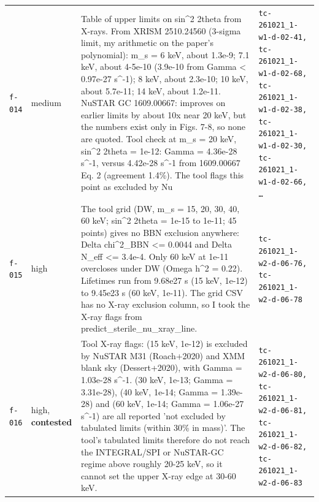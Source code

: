 \documentclass[11pt,a4paper]{article}
\begin{document}
\begin{longtable}{@{}p{}p{}p{}p{}@{}}
\texttt{f-014} & medium & Table of upper limits on sin\textasciicircum{}2 2theta from X-rays. From XRISM 2510.24560 (3-sigma limit, my arithmetic on the paper's polynomial): m\_s = 6 keV, about 1.3e-9; 7.1 keV, about 4-5e-10 (3.9e-10 from Gamma \textless{} 0.97e-27 s\textasciicircum{}-1); 8 keV, about 2.3e-10; 10 keV, about 5.7e-11; 14 keV, about 1.2e-11. NuSTAR GC 1609.00667: improves on earlier limits by about 10x near 20 keV, but the numbers exist only in Figs. 7-8, so none are quoted. Tool check at m\_s = 20 keV, sin\textasciicircum{}2 2theta = 1e-12: Gamma = 4.36e-28 s\textasciicircum{}-1, versus 4.42e-28 s\textasciicircum{}-1 from 1609.00667 Eq. 2 (agreement 1.4\%). The tool flags this point as excluded by Nu & \texttt{tc-261021\_\allowbreak{}1-w1-d-02-41,\allowbreak{} tc-261021\_\allowbreak{}1-w1-d-02-68,\allowbreak{} tc-261021\_\allowbreak{}1-w1-d-02-38,\allowbreak{} tc-261021\_\allowbreak{}1-w1-d-02-30,\allowbreak{} tc-261021\_\allowbreak{}1-w1-d-02-66,\allowbreak{} \ldots{}\allowbreak{}} \\
\texttt{f-015} & high & The tool grid (DW, m\_s = 15, 20, 30, 40, 60 keV; sin\textasciicircum{}2 2theta = 1e-15 to 1e-11; 45 points) gives no BBN exclusion anywhere: \textbar{}Delta chi\textasciicircum{}2\_BBN\textbar{} \textless{}= 0.0044 and Delta N\_eff \textless{}= 3.4e-4. Only 60 keV at 1e-11 overcloses under DW (Omega h\textasciicircum{}2 = 0.22). Lifetimes run from 9.68e27 s (15 keV, 1e-12) to 9.45e23 s (60 keV, 1e-11). The grid CSV has no X-ray exclusion column, so I took the X-ray flags from predict\_sterile\_nu\_xray\_line. & \texttt{tc-261021\_\allowbreak{}1-w2-d-06-76,\allowbreak{} tc-261021\_\allowbreak{}1-w2-d-06-78} \\
\texttt{f-016} & high, \textbf{contested} & Tool X-ray flags: (15 keV, 1e-12) is excluded by NuSTAR M31 (Roach+2020) and XMM blank sky (Dessert+2020), with Gamma = 1.03e-28 s\textasciicircum{}-1. (30 keV, 1e-13; Gamma = 3.31e-28), (40 keV, 1e-14; Gamma = 1.39e-28) and (60 keV, 1e-14; Gamma = 1.06e-27 s\textasciicircum{}-1) are all reported 'not excluded by tabulated limits (within 30\% in mass)'. The tool's tabulated limits therefore do not reach the INTEGRAL/SPI or NuSTAR-GC regime above roughly 20-25 keV, so it cannot set the upper X-ray edge at 30-60 keV. & \texttt{tc-261021\_\allowbreak{}1-w2-d-06-80,\allowbreak{} tc-261021\_\allowbreak{}1-w2-d-06-81,\allowbreak{} tc-261021\_\allowbreak{}1-w2-d-06-82,\allowbreak{} tc-261021\_\allowbreak{}1-w2-d-06-83} \\

\end{longtable}
\end{document}
